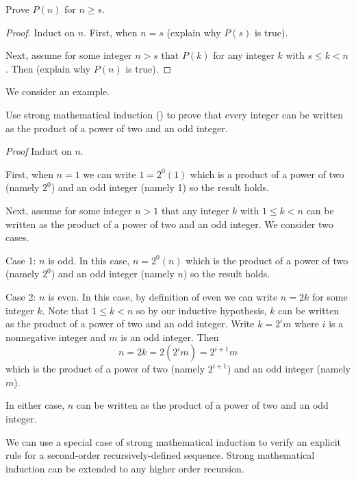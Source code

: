 \begin{pff}
\label{pff_strong_math_ind}
    Prove $P(n)$ for $n \ge s$.
    \begin{proof}
        Induct on $n$. First, when $n=s$ (explain why $P(s)$ is true).

        Next, assume for some integer $n > s$ that $P(k)$ for any integer $k$ with $s \le k< n$ .  Then (explain why $P(n)$ is true).
    \end{proof}
\end{pff}

We consider an example.

\begin{exam}
\label{exam_strong_math_ind}
    Use strong mathematical induction () to prove that every integer can be written as the product of a power of two and an odd integer.   
        \begin{soln}
            \emph{Proof} Induct on $n$. 

            First, when $n=1$ we can write $1=2^0(1)$ which is a product of a power of two (namely $2^0$) and an odd integer (namely 1) so the result holds.

            Next, assume for some integer $n > 1$ that any integer $k$ with $1 \le k<n$ can be written as the product of a power of two and an odd integer.  We consider two cases.

                Case 1: $n$ is odd.  In this case, $n = 2^0(n)$ which is the product of a power of two (namely $2^0$) and an odd integer (namely $n$) so the result holds.

                Case 2: $n$ is even.  In this case, by definition of even we can write  $n = 2k$ for some integer $k$.  Note that $1 \le k<n$ so by our inductive hypothesis, $k$ can be written as the product of a power of two and an odd integer.  Write $k = 2^im$ where $i$ is a nonnegative integer and $m$ is an odd integer.  Then $$n=2k=2\left(2^im\right)=2^{i+1}m$$ which is the product of a power of two (namely $2^{i+1}$) and an odd integer (namely $m$).

                In either case, $n$ can be written as the product of a power of two and an odd integer.
        \end{soln}
\end{exam}

We can use a special case of strong mathematical induction to verify an explicit rule for a second-order recursively-defined sequence.  Strong mathematical induction can be extended to any higher order recursion.

